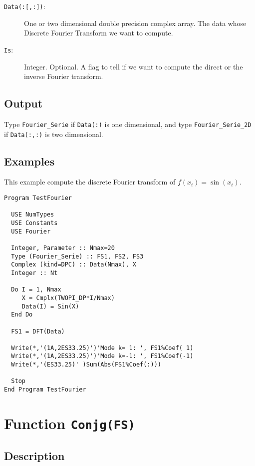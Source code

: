 \begin{description}
\item[\texttt{Data(:[,:])}:] One or two dimensional double precision complex
  array. The data whose Discrete Fourier Transform we want to
  compute.
\item[\texttt{Is}:] Integer. Optional. A flag to tell if we want to
  compute the direct or the inverse Fourier transform.
\end{description}

\subsection{Output}

Type \texttt{Fourier\_Serie} if \texttt{Data(:)} is one dimensional,
and type \texttt{Fourier\_Serie\_2D} if \texttt{Data(:,:)} is two
dimensional. 

\subsection{Examples}

This example compute the discrete Fourier transform of $f(x_i) =
\sin(x_i)$. 
\begin{verbatim}
Program TestFourier

  USE NumTypes
  USE Constants
  USE Fourier

  Integer, Parameter :: Nmax=20
  Type (Fourier_Serie) :: FS1, FS2, FS3
  Complex (kind=DPC) :: Data(Nmax), X
  Integer :: Nt

  Do I = 1, Nmax
     X = Cmplx(TWOPI_DP*I/Nmax)
     Data(I) = Sin(X)
  End Do

  FS1 = DFT(Data)

  Write(*,'(1A,2ES33.25)')'Mode k= 1: ', FS1%Coef( 1)
  Write(*,'(1A,2ES33.25)')'Mode k=-1: ', FS1%Coef(-1)
  Write(*,'(ES33.25)' )Sum(Abs(FS1%Coef(:)))

  Stop
End Program TestFourier
\end{verbatim}

\section{Function \texttt{Conjg(FS)}}

\subsection{Description}

